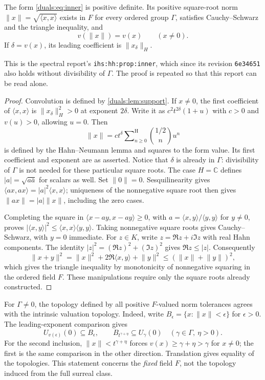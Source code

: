 \documentclass[11pt,letterpaper]{article}
\numberwithin{equation}{section}
\theoremstyle{definition}
\theoremstyle{remark}
\newcommand{\C}{\mathbb C}
\newcommand{\sH}{\mathop{\sum}\nolimits^{\mathrm H}}
\newcommand{\norm}[1]{\lVert#1\rVert}
\newcommand{\ip}[2]{\langle#1,#2\rangle}
\newcommand{\ihs}[1]{\texttt{ihs:#1}}
\begin{document}
\begin{proposition}
\label{duals:prop:norm}
The form \eqref{duals:eq:inner} is positive definite. Its positive square-root
norm $\norm{x}=\sqrt{\ip{x}{x}}$ exists in $F$ for every ordered group
$\Gamma$, satisfies Cauchy--Schwarz and the triangle inequality, and
\[
 v(\norm{x})=v(x)\qquad(x\ne0).
\]
If $\delta=v(x)$, its leading coefficient is $\norm{x_\delta}_H$.
\end{proposition}
This is the spectral report's \ihs{hh:prop:inner}, which since its revision
\texttt{6e34651} also holds without divisibility of $\Gamma$. The proof
is repeated so that this report can be read alone.
\begin{proof}
Convolution is defined by \cref{duals:lem:support}. If $x\ne0$, the first
coefficient of $\ip{x}{x}$ is $\norm{x_\delta}_H^2>0$ at exponent
$2\delta$. Write it as
$c^2t^{2\delta}(1+u)$ with $c>0$ and $v(u)>0$, allowing $u=0$.
Then
\[
 \norm{x}=ct^\delta\sH_{n\ge0}\binom{1/2}{n}u^n
\]
is defined by the Hahn--Neumann lemma and squares to the form value.
Its first coefficient and exponent are as asserted. Notice that
$\delta$ is already in $\Gamma$: divisibility of $\Gamma$ is not
needed for these particular square roots. The case $H=\C$ defines
$|a|=\sqrt{a\bar a}$ for scalars as well. Set $\norm0=0$.
Sesquilinearity gives $\ip{ax}{ax}=|a|^2\ip{x}{x}$; uniqueness
of the nonnegative square root then gives
$\norm{ax}=|a|\norm{x}$, including the zero cases.

Completing the square in
$\ip{x-ay}{x-ay}\ge0$, with
$a=\ip{x}{y}/\ip{y}{y}$ for $y\ne0$, proves
$|\ip{x}{y}|^2\le\ip{x}{x}\ip{y}{y}$.
Taking nonnegative square roots gives Cauchy--Schwarz, with $y=0$
immediate. For $z\in K$, write $z=\Re z+i\Im z$ with real Hahn
components. The identity $|z|^2=(\Re z)^2+(\Im z)^2$ gives
$\Re z\le|z|$. Consequently
\[
 \norm{x+y}^2
 =\norm{x}^2+2\Re\ip{x}{y}+\norm{y}^2
 \le(\norm{x}+\norm{y})^2,
\]
which gives the triangle inequality by monotonicity of nonnegative
squaring in the ordered field $F$. These manipulations require only
the square roots already constructed.
\end{proof}

For $\Gamma\ne0$, the topology defined by all positive $F$-valued
norm tolerances agrees with the intrinsic valuation topology. Indeed,
write $B_\epsilon=\{x:\norm{x}<\epsilon\}$ for $\epsilon>0$.
The leading-exponent comparison gives
\[
 U_{v(\epsilon)}(0)\subseteq B_\epsilon,
 \qquad
 B_{t^{\gamma+\eta}}\subseteq U_\gamma(0)
 \quad(\gamma\in\Gamma,\ \eta>0).
\]
For the second inclusion, $\norm{x}<t^{\gamma+\eta}$ forces
$v(x)\ge\gamma+\eta>\gamma$ for $x\ne0$; the first is the
same comparison in the other direction. Translation gives equality
of the topologies. This statement concerns the \emph{fixed} field $F$,
not the topology induced from the full surreal class.
\end{document}

